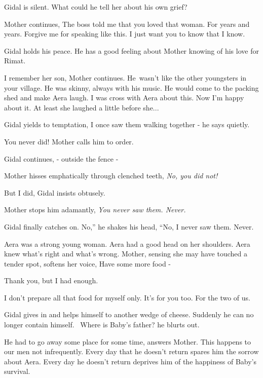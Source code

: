 \documentclass[letterpaper]{article}
\begin{document}
Gidal is silent. What could he tell her about his own grief? ~

Mother continues, {\textquotedbl}The boss told me that you loved that woman. For years and years. Forgive me for
speaking like this. I just want you to know that I know.{\textquotedbl} 

Gidal holds his peace. He has a good feeling about Mother knowing of his love for Rimat. 

{\textquotedbl}I remember her son,{\textquotedbl} Mother continues. {\textquotedbl}He~wasn't like the other youngsters
in your village. He was skinny, always with his\textcolor[rgb]{0.0,0.4392157,0.7529412}{ music}. He would come to the
packing shed and make Aera laugh. I was cross with Aera about this. Now I'm happy about it. At least she laughed a
little before she... {\textquotedbl} 

Gidal yields to temptation, {\textquotedbl}I once saw them walking together -{\textquotedbl} he says quietly.

{\textquotedbl}You never did!{\textquotedbl} Mother calls him to order.

Gidal continues, {\textquotedbl}- outside the fence -{\textquotedbl} 

Mother hisses emphatically through clenched teeth, {\textquotedbl}\textit{No, you did not!}{\textquotedbl} 

{\textquotedbl}But I did,{\textquotedbl} Gidal insists obtusely. 

Mother stops him adamantly, {\textquotedbl}\textit{You never saw them. Never.}{\textquotedbl} 

Gidal finally catches on. {\textquotedbl}No,'' he shakes his head, ``No, I never saw them. Never.{\textquotedbl} 

{\textquotedbl}Aera was a strong young woman. Aera had a good head on her shoulders. Aera knew what's right and what's
wrong.{\textquotedbl} Mother, sensing she may have touched a tender spot, softens her voice, {\textquotedbl}Have some
more food -{\textquotedbl} 

{\textquotedbl}Thank you, but I had enough.{\textquotedbl}

{\textquotedbl}I don't prepare all that food for myself only. It's for you too. For the two of us.{\textquotedbl}

Gidal gives in and helps himself to another wedge of cheese. Suddenly he can no longer contain himself.
\ {\textquotedbl}Where is Baby's father?{\textquotedbl} he blurts out.

{\textquotedbl}He had to go away some place for some time,{\textquotedbl} answers Mother. {\textquotedbl}This happens to
our men not infrequently. Every day that he doesn't return spares him the sorrow about Aera. Every day he doesn't
return deprives him of the happiness of Baby's survival. {\textquotedbl} 
\end{document}
